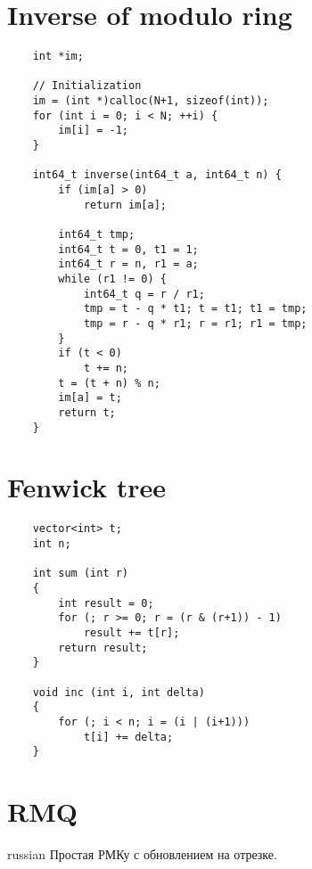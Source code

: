 \documentclass{article}
\begin{document}
\section{Inverse of modulo ring}
\begin{verbatim}
    int *im;

    // Initialization
    im = (int *)calloc(N+1, sizeof(int)); 
    for (int i = 0; i < N; ++i) {         
        im[i] = -1;                       
    }                                     

    int64_t inverse(int64_t a, int64_t n) {                                             
        if (im[a] > 0)                            
            return im[a];                         
                                                  
        int64_t tmp;                              
        int64_t t = 0, t1 = 1;                    
        int64_t r = n, r1 = a;                    
        while (r1 != 0) {                         
            int64_t q = r / r1;                   
            tmp = t - q * t1; t = t1; t1 = tmp;   
            tmp = r - q * r1; r = r1; r1 = tmp;   
        }                                         
        if (t < 0)                                
            t += n;                               
        t = (t + n) % n;                          
        im[a] = t;                                
        return t;                                 
    }                                             
\end{verbatim}

\section{Fenwick tree}
\begin{verbatim}
    vector<int> t;
    int n;

    int sum (int r)
    {
        int result = 0;
        for (; r >= 0; r = (r & (r+1)) - 1)
            result += t[r];
        return result;
    }

    void inc (int i, int delta)
    {
        for (; i < n; i = (i | (i+1)))
            t[i] += delta;
    }
\end{verbatim}

\section{RMQ}
\begin{otherlanguage*}{russian}
Простая РМКу с обновлением на отрезке.
\end{otherlanguage*}
\end{document}
